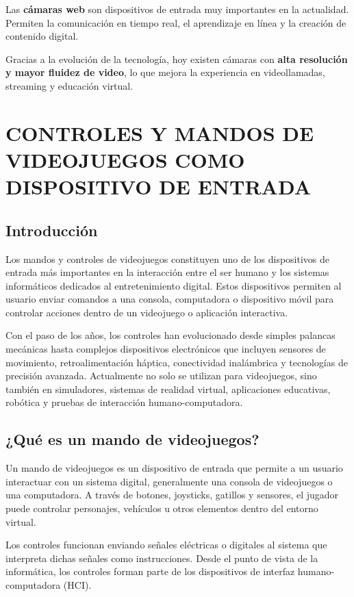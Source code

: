\documentclass[12pt, letterpaper]{article}
\begin{document}
Las \textbf{cámaras web} son dispositivos de entrada muy importantes en la actualidad.
Permiten la comunicación en tiempo real, el aprendizaje en línea y la creación de contenido digital.

Gracias a la evolución de la tecnología, hoy existen cámaras con \textbf{alta resolución y mayor fluidez de video}, lo que mejora la experiencia en videollamadas, streaming y educación virtual.

\newpage
\section{CONTROLES Y MANDOS DE VIDEOJUEGOS COMO DISPOSITIVO DE ENTRADA}

\subsection{Introducción}

Los mandos y controles de videojuegos constituyen uno de los dispositivos de entrada más importantes en la interacción entre el ser humano y los sistemas informáticos dedicados al entretenimiento digital. Estos dispositivos permiten al usuario enviar comandos a una consola, computadora o dispositivo móvil para controlar acciones dentro de un videojuego o aplicación interactiva.

Con el paso de los años, los controles han evolucionado desde simples palancas mecánicas hasta complejos dispositivos electrónicos que incluyen sensores de movimiento, retroalimentación háptica, conectividad inalámbrica y tecnologías de precisión avanzada. Actualmente no solo se utilizan para videojuegos, sino también en simuladores, sistemas de realidad virtual, aplicaciones educativas, robótica y pruebas de interacción humano-computadora.

\subsection{¿Qué es un mando de videojuegos?}

Un mando de videojuegos es un dispositivo de entrada que permite a un usuario interactuar con un sistema digital, generalmente una consola de videojuegos o una computadora. A través de botones, joysticks, gatillos y sensores, el jugador puede controlar personajes, vehículos u otros elementos dentro del entorno virtual.

Los controles funcionan enviando señales eléctricas o digitales al sistema que interpreta dichas señales como instrucciones. Desde el punto de vista de la informática, los controles forman parte de los dispositivos de interfaz humano-computadora (HCI).
\end{document}
